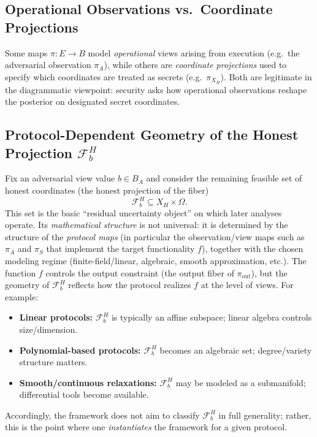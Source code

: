 \documentclass[11pt,a4paper]{article}
\theoremstyle{definition}
\theoremstyle{plain}
\newcommand{\cF}{\mathcal{F}}
\begin{document}
\subsection{Operational Observations vs.\ Coordinate Projections}
Some maps $\pi:E\to B$ model \emph{operational} views arising from execution
(e.g.\ the adversarial observation $\pi_A$), while others are \emph{coordinate projections}
used to specify which coordinates are treated as secrets (e.g.\ $\pi_{X_H}$).
Both are legitimate in the diagrammatic viewpoint: security asks how operational observations
reshape the posterior on designated secret coordinates.

\subsection{Protocol-Dependent Geometry of the Honest Projection \texorpdfstring{$\cF_b^H$}{F_b^H}}
Fix an adversarial view value $b\in B_A$ and consider the remaining feasible set of honest
coordinates (the honest projection of the fiber)
\[
\cF_b^H \subseteq X_H\times \Omega.
\]
This set is the basic ``residual uncertainty object'' on which later analyses operate.
Its \emph{mathematical structure} is not universal: it is determined by the structure of the \emph{protocol maps} (in particular the observation/view maps such as $\pi_A$ and $\pi_S$ that implement the target functionality $f$), together with the chosen modeling regime (finite-field/linear, algebraic, smooth approximation, etc.).
The function $f$ controls the output constraint (the output fiber of $\pi_{\mathrm{out}}$), but the geometry of $\cF_b^H$ reflects how the protocol realizes $f$ at the level of views.
For example:
\begin{itemize}
\item \textbf{Linear protocols:} $\cF_b^H$ is typically an affine subspace; linear algebra controls size/dimension.
\item \textbf{Polynomial-based protocols:} $\cF_b^H$ becomes an algebraic set; degree/variety structure matters.
\item \textbf{Smooth/continuous relaxations:} $\cF_b^H$ may be modeled as a submanifold; differential tools become available.
\end{itemize}
Accordingly, the framework does not aim to classify $\cF_b^H$ in full generality; rather, this
is the point where one \emph{instantiates} the framework for a given protocol.
\end{document}
